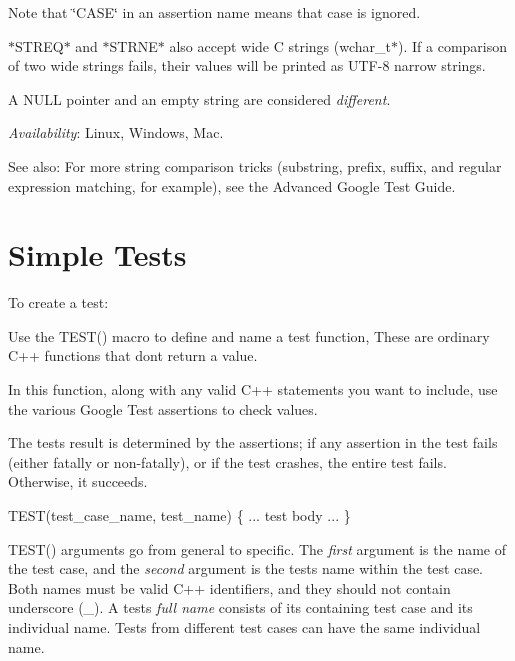 Note that \char`\"{}\+C\+A\+S\+E\char`\"{} in an assertion name means that case is ignored.

{\ttfamily $\ast$\+S\+T\+R\+E\+Q$\ast$} and {\ttfamily $\ast$\+S\+T\+R\+N\+E$\ast$} also accept wide C strings ({\ttfamily wchar\+\_\+t$\ast$}). If a comparison of two wide strings fails, their values will be printed as U\+T\+F-\/8 narrow strings.

A {\ttfamily N\+U\+LL} pointer and an empty string are considered {\itshape different}.

{\itshape Availability}\+: Linux, Windows, Mac.

See also\+: For more string comparison tricks (substring, prefix, suffix, and regular expression matching, for example), see the Advanced Google Test Guide.

\section*{Simple Tests}

To create a test\+:
\begin{DoxyEnumerate}
\item Use the {\ttfamily T\+E\+S\+T()} macro to define and name a test function, These are ordinary C++ functions that don\textquotesingle{}t return a value.
\end{DoxyEnumerate}
\begin{DoxyEnumerate}
\item In this function, along with any valid C++ statements you want to include, use the various Google Test assertions to check values.
\end{DoxyEnumerate}
\begin{DoxyEnumerate}
\item The test\textquotesingle{}s result is determined by the assertions; if any assertion in the test fails (either fatally or non-\/fatally), or if the test crashes, the entire test fails. Otherwise, it succeeds.
\end{DoxyEnumerate}


\begin{DoxyCode}
TEST(test\_case\_name, test\_name) \{
 ... test body ...
\}
\end{DoxyCode}


{\ttfamily T\+E\+S\+T()} arguments go from general to specific. The {\itshape first} argument is the name of the test case, and the {\itshape second} argument is the test\textquotesingle{}s name within the test case. Both names must be valid C++ identifiers, and they should not contain underscore ({\ttfamily \+\_\+}). A test\textquotesingle{}s {\itshape full name} consists of its containing test case and its individual name. Tests from different test cases can have the same individual name.

